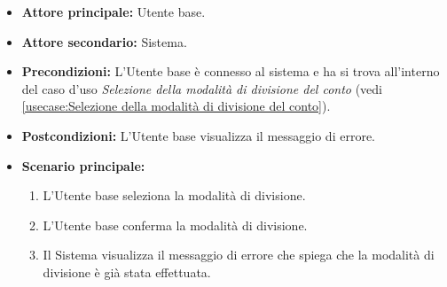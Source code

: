 \label{usecase:Modalità di divisione del conto già effettuata}
\begin{itemize}
	\item \textbf{Attore principale:} Utente base.

	\item \textbf{Attore secondario:} Sistema.

	\item \textbf{Precondizioni:}
	      L'Utente base è connesso al sistema e ha si trova all'interno del caso
	      d'uso \textit{Selezione della modalità di divisione del conto} (vedi
	      \autoref{usecase:Selezione della modalità di divisione del conto}).

	\item \textbf{Postcondizioni:}
	      L'Utente base visualizza il messaggio di errore.

	\item \textbf{Scenario principale:}
	      \begin{enumerate}
		      \item L'Utente base seleziona la modalità di divisione.

		      \item L'Utente base conferma la modalità di divisione.

		      \item Il Sistema visualizza il messaggio di errore che spiega che
		            la modalità di divisione è già stata effettuata.
	      \end{enumerate}
\end{itemize}
